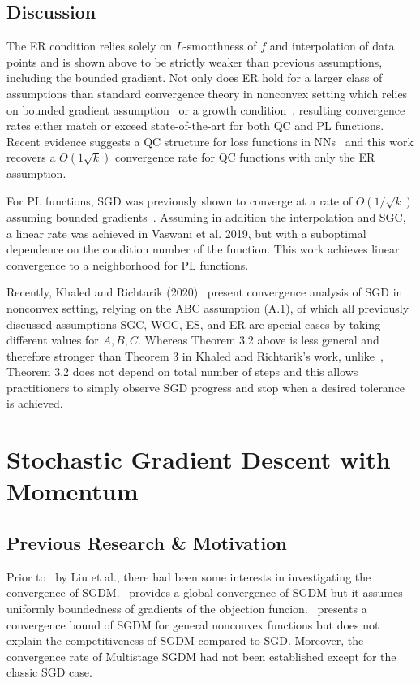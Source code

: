 \documentclass{article}
\begin{document}
\subsection{Discussion}

The ER condition relies solely on $L$-smoothness of $f$ and interpolation of data points and is shown above to be strictly weaker than previous assumptions, including the bounded gradient. Not only does ER hold for a larger class of assumptions than standard convergence theory in nonconvex
setting which relies on bounded gradient assumption~\cite{https://doi.org/10.48550/arxiv.1106.5730, JMLR:v15:hazan14a, Rakhlin2012MakingGD} or a growth condition~\cite{Bertsekas1995NeurodynamicPA, https://doi.org/10.48550/arxiv.1606.04838, Schmidt2017MinimizingFS},
resulting convergence rates either match or exceed state-of-the-art for both QC and PL functions.
Recent evidence suggests a QC structure for loss functions in NNs~\cite{Zhou2019SGDCT} and this work recovers a $O(1\sqrt{k})$ convergence rate for QC functions with only the ER assumption.

For PL functions, SGD was previously shown to converge at a rate of $O(1/\sqrt{k})$ assuming bounded gradients~\cite{Karimi2016LinearCO}. Assuming in addition the interpolation and SGC, a linear rate was achieved in Vaswani et al. 2019, but with a suboptimal dependence on the condition number
of the function. This work achieves linear convergence to a neighborhood for PL functions.

Recently, Khaled and Richtarik (2020)~\cite{https://doi.org/10.48550/arxiv.2002.03329} present convergence analysis of SGD in nonconvex setting, relying on the ABC assumption (A.1), of which all previously discussed assumptions SGC, WGC, ES, and ER are special cases by taking different values for $A,B,C$. Whereas
Theorem 3.2 above is less general and therefore stronger than Theorem 3 in Khaled and Richtarik's work, unlike~\cite{https://doi.org/10.48550/arxiv.2002.03329}, Theorem 3.2 does not depend on total number of steps and this allows practitioners to simply
observe SGD progress and stop when a desired tolerance is achieved.

\section{Stochastic Gradient Descent with Momentum}
\label{section4}
\subsection{Previous Research \& Motivation}
\setcounter{equation}{0}
Prior to~\cite{NEURIPS2020_d3f5d4de} by Liu et al., there had been some interests in investigating the convergence of SGDM.~\cite{https://doi.org/10.48550/arxiv.1905.03817} provides a global convergence of SGDM but it assumes uniformly boundedness of gradients of the objection funcion.~\cite{https://doi.org/10.48550/arxiv.1808.10396} presents a convergence bound of SGDM for general nonconvex functions but does not explain the competitiveness of SGDM compared to SGD.
Moreover, the convergence rate of Multistage SGDM had not been established except for the classic SGD case.
\end{document}
